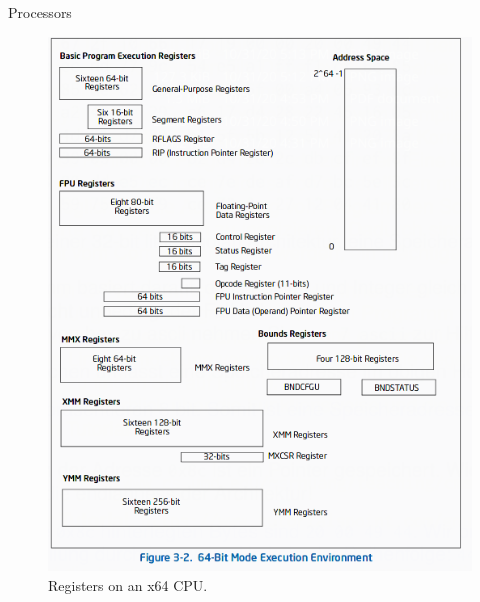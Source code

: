 \documentclass[10pt]{beamer}
\begin{document}
\begin{frame}[allowframebreaks]{Processors}
\begin{figure}
      \end{figure}
      \framebreak
      \begin{figure}
       \begin{center}
       \includegraphics[keepaspectratio, width=\textwidth,height=0.9\textheight-4\baselineskip]{img/206_registers.png}
      \end{center}
      \caption{Registers on an x64 CPU.~\autocite{intel}}
      \end{figure}
\end{frame}
\end{document}

